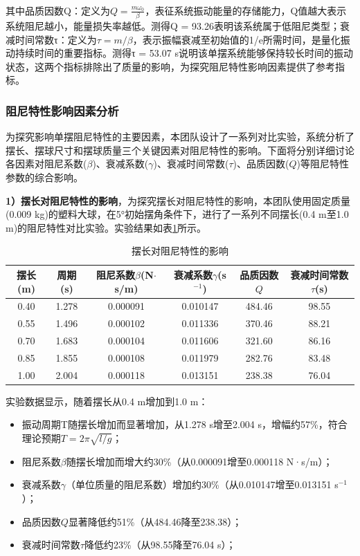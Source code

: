 其中品质因数Q\textsuperscript{\cite{DXWL201705004}}：定义为$Q = \frac{m\omega_0}{\beta}$，表征系统振动能量的存储能力，Q值越大表示系统阻尼越小，能量损失率越低。测得Q = 93.26表明该系统属于低阻尼类型；衰减时间常数τ：定义为$\tau = m/\beta$，表示振幅衰减至初始值的1/e所需时间，是量化振动持续时间的重要指标。测得τ = 53.07 s说明该单摆系统能够保持较长时间的振动状态，这两个指标排除出了质量的影响，为探究阻尼特性影响因素提供了参考指标。


\subsubsection{阻尼特性影响因素分析}

为探究影响单摆阻尼特性的主要因素，本团队设计了一系列对比实验，系统分析了摆长、摆球尺寸和摆球质量三个关键因素对阻尼特性的影响。下面将分别详细讨论各因素对阻尼系数($\beta$)、衰减系数($\gamma$)、衰减时间常数($\tau$)、品质因数($Q$)等阻尼特性参数的综合影响。

\textbf{1）摆长对阻尼特性的影响}，为探究摆长对阻尼特性的影响，本团队使用固定质量(0.009 kg)的塑料大球，在5°初始摆角条件下，进行了一系列不同摆长(0.4 m至1.0 m)的阻尼特性对比实验。实验结果如表\ref{tab:length_damping}所示。

\begin{table}[H]
\centering
\caption{摆长对阻尼特性的影响}
\begin{tabular}{c c c c c c@{}}
\toprule
\textbf{摆长(m)} & \textbf{周期(s)} & \textbf{阻尼系数$\beta$(N$\cdot$s/m)} & \textbf{衰减系数$\gamma$(s$^{-1}$)} & \textbf{品质因数$Q$} & \textbf{衰减时间常数$\tau$(s)} \\
\midrule
0.40 & 1.278 & 0.000091 & 0.010147 & 484.46 & 98.55 \\
0.55 & 1.496 & 0.000102 & 0.011336 & 370.46 & 88.21 \\
0.70 & 1.683 & 0.000104 & 0.011606 & 321.60 & 86.16 \\
0.85 & 1.855 & 0.000108 & 0.011979 & 282.76 & 83.48 \\
1.00 & 2.004 & 0.000118 & 0.013151 & 238.38 & 76.04 \\
\bottomrule
\end{tabular}
\label{tab:length_damping}
\end{table}

实验数据显示，随着摆长从0.4 m增加到1.0 m：
\begin{itemize}
  \item 振动周期T随摆长增加而显著增加，从1.278 s增至2.004 s，增幅约57\%，符合理论预期$T = 2\pi\sqrt{l/g}$；
  \item 阻尼系数$\beta$随摆长增加而增大约30\%（从0.000091增至0.000118 N·s/m）；
  \item 衰减系数$\gamma$（单位质量的阻尼系数）增加约30\%（从0.010147增至0.013151 s$^{-1}$）；
  \item 品质因数$Q$显著降低约51\%（从484.46降至238.38）；
  \item 衰减时间常数$\tau$降低约23\%（从98.55降至76.04 s）；
\end{itemize}

